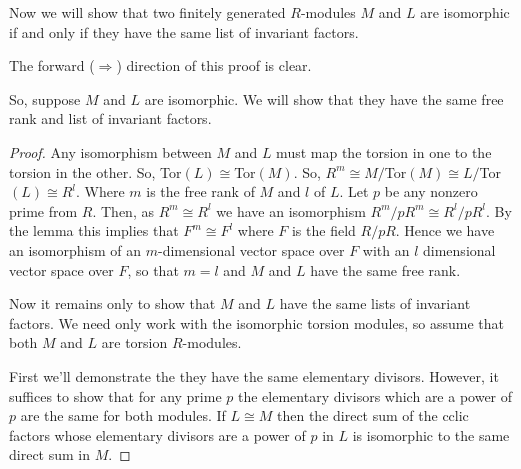 \documentclass[11pt]{article}
\begin{document}
Now we will show that two finitely generated $R$-modules $M$ and $L$ are isomorphic if and only if they have the same list of invariant factors. 

The forward ($\Rightarrow$) direction of this proof is clear. 

So, suppose $M$ and $L$ are isomorphic. We will show that they have the same free rank and list of invariant factors.
\begin{proof}
Any isomorphism between $M$ and $L$ must map the torsion in one to the torsion in the other. So, Tor$(L) \cong$Tor$(M)$. So, $R^m \cong M/$Tor$(M) \cong L/$Tor$(L) \cong R^l$. Where $m$ is the free rank of $M$ and $l$ of $L$. Let $p$ be any nonzero prime from $R$. Then, as $R^ m \cong R^l$ we have an isomorphism $R^m / p R^m \cong R^l / p R^l$. By the lemma this implies that $F^m \cong F^l$ where $F$ is the field $R/pR$. Hence we have an isomorphism of an $m$-dimensional vector space over $F$ with an $l$ dimensional vector space over $F$, so that $m =l$ and $M$ and $L$ have the same free rank.

Now it remains only to show that $M$ and $L$ have the same lists of invariant factors. We need only work with the isomorphic torsion modules, so assume that both $M$ and $L$ are torsion $R$-modules.

First we'll demonstrate the they have the same elementary divisors. However, it suffices to show that for any prime $p$ the elementary divisors which are a power of $p$ are the same for both modules. If $L \cong M$ then the direct sum of the cclic factors whose elementary divisors are a power of $p$ in $L$ is isomorphic to the same direct sum in $M$.


\end{proof}
\end{document}
